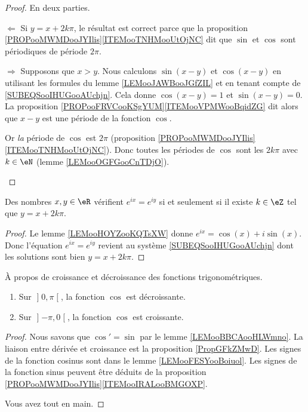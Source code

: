 \begin{proof}
    En deux parties.
	\begin{subproof}
		\item[$ \Leftarrow$]
		Si \( y=x+2k\pi\), le résultat est correct parce que la proposition \ref{PROPooMWMDooJYIlis}\ref{ITEMooTNHMooUtOjNC} dit que \( \sin\) et \( \cos\) sont périodiques de période \( 2\pi\).
		\item[$ \Rightarrow$]
		Supposons que \( x>y\). Nous calculons \( \sin(x-y)\) et \( \cos(x-y)\) en utilisant les formules du lemme \ref{LEMooJAWBooJGfZIL} et en tenant compte de \eqref{SUBEQSooIHUGooAUchjn}. Cela donne \( \cos(x-y)=1\) et \( \sin(x-y)=0\). La proposition \ref{PROPooFRVCooKSgYUM}\ref{ITEMooVPMWooBqidZG} dit alors que \( x-y\) est une période de la fonction \( \cos\).

		Or \emph{la} période de \( \cos\) est \( 2\pi\) (proposition \ref{PROPooMWMDooJYIlis}\ref{ITEMooTNHMooUtOjNC}). Donc toutes les périodes de \( \cos\) sont les \( 2k\pi\) avec \( k\in \eN\) (lemme \ref{LEMooOGFGooCnTDjO}).
	\end{subproof}
\end{proof}

\begin{corollary}   \label{CORooTFMAooHDRrqi}
	Des nombres \( x,y\in \eR\) vérifient \(  e^{ix}= e^{iy}\) si et seulement si il existe \( k\in\eZ\) tel que \( y=x+2k\pi\).
\end{corollary}

\begin{proof}
    Le lemme \ref{LEMooHOYZooKQTsXW} donne \(  e^{ix}=\cos(x)+i\sin(x)\). Donc l'équation \(  e^{ix}= e^{iy}\) revient au système \eqref{SUBEQSooIHUGooAUchjn} dont les solutions sont bien \( y=x+2k\pi\).
\end{proof}

\begin{lemma}        \label{LEMooBIPFooQNiTqZ}
	À propos de croissance et décroissance des fonctions trigonométriques.
	\begin{enumerate}
		\item
		      Sur \( \mathopen] 0 , \pi \mathclose[\), la fonction \( \cos\) est décroissante.
		\item
		      Sur \( \mathopen] -\pi , 0 \mathclose[\), la fonction \( \cos\) est croissante.
	\end{enumerate}
\end{lemma}

\begin{proof}
	Nous savons que \( \cos'=\sin\) par le lemme \ref{LEMooBBCAooHLWmno}. La liaison entre dérivée et croissance est la proposition \ref{PropGFkZMwD}. Les signes de la fonction cosinus sont dans le lemme \ref{LEMooFESYooBoiuol}. Les signes de la fonction sinus peuvent être déduits de la proposition \ref{PROPooMWMDooJYIlis}\ref{ITEMooIRALooBMGOXP}.

	Vous avez tout en main.
\end{proof}


